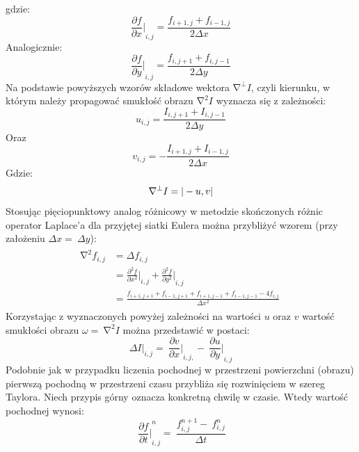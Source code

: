 \documentclass[12pt, twoside, openany]{report}
\theoremstyle{definition}
\begin{document}
gdzie:
\begin{equation}
{\frac{\partial f}{\partial x}|}_{i,j}=\frac{f_{i+1,j}+f_{i-1,j}}{2\Delta x}
\label{dfdx}
\end{equation}
Analogicznie:
\begin{equation}
{\frac{\partial f}{\partial y}|}_{i,j}=\frac{f_{i,j+1}+f_{i,j-1}}{2\Delta y}
\label{dfdy}
\end{equation}
Na podstawie powyższych wzorów składowe wektora ${\mathrm{\nabla }}^{\bot }I$, czyli kierunku, w którym należy propagować smukłość obrazu ${\mathrm{\nabla }}^2I$ wyznacza się z zależności:
\begin{equation}
u_{i,j}=\frac{I_{i,j+1}+I_{i,j-1}}{2\Delta y} 
\label{u}
\end{equation}
Oraz
\begin{equation}
 v_{i,j}=-\frac{I_{i+1,j}+I_{i-1,j}}{2\Delta x}
\label{v}
\end{equation}
Gdzie:
\begin{equation}\\
{\mathrm{\nabla }}^{\bot }I=|-u,v|
\label{gradI}
\end{equation}
Stosując pięciopunktowy analog różnicowy w metodzie skończonych różnic operator Laplace’a dla przyjętej siatki Eulera można przybliżyć wzorem (przy założeniu $\Delta x=\ \Delta y$):
\begin{align}
\begin{aligned}
{\mathrm{\nabla }}^2f_{i,j} &= \Delta f_{i,j} \\[1ex]
&={\frac{{\partial }^2f}{\partial x^2}|}_{i,j}+{\frac{{\partial }^2f}{\partial y^2}|}_{i,j} \\
&=\frac{f_{i+1,j+1}+f_{i-1,j+1}+f_{i+1,j-1}+f_{i-1,j-1}-4f_{i,j}}{\Delta x^2}\ 
\end{aligned}
\label{LaplaceOpr}
\end{align}
Korzystając z wyznaczonych powyżej zależności na wartości $u$ oraz $v$ wartość smukłości obrazu $\omega =\ {\mathrm{\nabla }}^2I$ można przedstawić w postaci: 
\begin{equation}
\Delta {I|}_{i,j}=\ {\frac{\partial v}{\partial x}|}_{i,j,}-\ {\frac{\partial u}{\partial y}|}_{i,j}
\label{discreteVorticity}
\end{equation}
Podobnie jak w przypadku liczenia pochodnej w przestrzeni powierzchni (obrazu) pierwszą pochodną w przestrzeni czasu przybliża się rozwinięciem w szereg Taylora. Niech przypis górny oznacza konkretną chwilę w czasie. Wtedy wartość pochodnej wynosi:
\begin{equation}
\ {{\frac{\partial f}{\partial t}|}^n_{i,j}=\ \frac{f^{n+1}_{i,j}-\ f^n_{i,j}}{\Delta t}}
\label{dfdt}
\end{equation}
\end{document}
